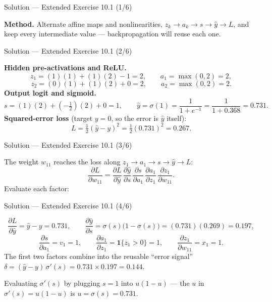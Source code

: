 \documentclass[aspectratio=169,11pt]{beamer}
\begin{document}
\begin{frame}{Solution --- Extended Exercise 10.1 (1/6)}
\begin{solutionbox}
  \textbf{Method.} Alternate affine maps and nonlinearities,
  $z_k \to a_k \to s \to \hat y \to L$, and keep every intermediate value ---
  backpropagation will reuse each one.
\end{solutionbox}
\end{frame}

\begin{frame}{Solution --- Extended Exercise 10.1 (2/6)}
\begin{solutionbox}
  \medskip
  \textbf{Hidden pre-activations and ReLU.}
  \[
    z_1=(1)(1)+(1)(2)-1=2,\qquad a_1=\max(0,2)=2,
  \]
  \[
    z_2=(0)(1)+(1)(2)+0=2,\qquad a_2=\max(0,2)=2.
  \]
  \textbf{Output logit and sigmoid.}
  \[
    s=(1)(2)+(-\tfrac12)(2)+0=1,\qquad
    \hat y=\sigma(1)=\frac{1}{1+e^{-1}}=\frac{1}{1+0.368}=0.731 .
  \]
  \textbf{Squared-error loss} (target $y=0$, so the error is $\hat y$ itself):
  \[
    L=\tfrac12(\hat y-y)^2=\tfrac12(0.731)^2=0.267 .
  \]
\end{solutionbox}
\end{frame}

\begin{frame}{Solution --- Extended Exercise 10.1 (3/6)}
\begin{solutionbox}
  The weight $w_{11}$ reaches the loss along
  $z_1\!\to\!a_1\!\to\!s\!\to\!\hat y\!\to\!L$:
  \[
    \frac{\partial L}{\partial w_{11}}
    =\frac{\partial L}{\partial \hat y}\,
     \frac{\partial \hat y}{\partial s}\,
     \frac{\partial s}{\partial a_1}\,
     \frac{\partial a_1}{\partial z_1}\,
     \frac{\partial z_1}{\partial w_{11}} .
  \]
  Evaluate each factor:
\end{solutionbox}
\end{frame}

\begin{frame}{Solution --- Extended Exercise 10.1 (4/6)}
\begin{solutionbox}
  \[
    \frac{\partial L}{\partial \hat y}=\hat y-y=0.731,\qquad
    \frac{\partial \hat y}{\partial s}=\sigma(s)\big(1-\sigma(s)\big)=(0.731)(0.269)=0.197,
  \]
  \[
    \frac{\partial s}{\partial a_1}=v_1=1,\qquad
    \frac{\partial a_1}{\partial z_1}=\mathbf{1}\{z_1>0\}=1,\qquad
    \frac{\partial z_1}{\partial w_{11}}=x_1=1 .
  \]
  The first two factors combine into the reusable ``error signal''
  $\delta=(\hat y-y)\,\sigma'(s)=0.731\times0.197=0.144$.
\end{solutionbox}
\begin{mistake}
  Evaluating $\sigma'(s)$ by plugging $s=1$ into $u(1-u)$ --- the $u$ in
  $\sigma'(s)=u(1-u)$ is $u=\sigma(s)=0.731$.
\end{mistake}
\end{frame}
\end{document}
